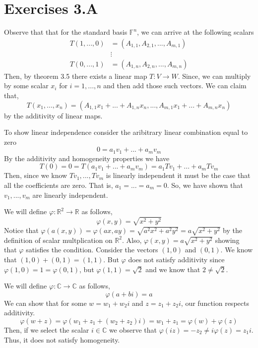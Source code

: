 \documentclass[10pt, twocolumn]{article}
\newcommand{\C}{\mathbb{C}}
\newcommand{\R}{\mathbb{R}}
\newcommand{\F}{\mathbb{F}}
\begin{document}
\section{Exercises 3.A}
\begin{q}[3]
	Observe that that for the standard basis $ \F^n $, 
	we can arrive at the following scalars 
	\begin{align*}
		T(1, ..., 0) &= (A_{1, 1}, A_{2, 1}, ..., A_{m, 1}) \\
		& \vdots \\
		T(0, ..., 1) &= (A_{1, n}, A_{2, n}, ..., A_{m, n})
	\end{align*}
	Then, by theorem 3.5 there exists a linear map $ T: V \to W $. 
	Since, we can multiply by some scalar $ x_i $ for $ i = 1, ..., n $ and then add those such vectors. 
	We can claim that, 
	$$ T(x_1, ..., x_n ) =  (A_{1, 1}x_1 + ... + A_{1, n}x_n, ..., A_{m, 1}x_1 + ...+ A_{m, n} x_n) $$
	by the additivity of linear maps. 
\end{q}
\begin{q}[4]
	To show linear independence consider the aribitrary linear combination equal to zero
	$$ 0 = a_1v_1 + ... + a_m v_m $$
	By the additivity and homogeneity properties we have 
	$$ T(0) = 0 = T(a_1v_1 + ... + a_m v_m) = a_1Tv_1 + ... + a_mTv_m $$
	Then, since we know $ Tv_1, ..., Tv_m $ is linearly independent it must be the case that all the coefficients are zero. 
	That is, $ a_1 = ... = a_m = 0 $. 
	So, we have shown that $ v_1, ..., v_m $ are linearly independent. 
\end{q}
\begin{q}[8]
	We will define $ \varphi: \R^2 \to \R $ as follows, 
	\[ \varphi (x, y) = \sqrt{x^2 + y^2} \]
	Notice that $ \varphi(a(x, y)) = \varphi(ax, ay) = \sqrt{a^2x^2 + a^2y^2} = a \sqrt{x^2 + y^2} $ by the definition of scalar multplication on $ \R^2 $.
	Also, $\varphi(x, y) = a\sqrt{x^2 + y^2}$ showing that $ \varphi $ satisfies the condition.
	Consider the vectors $ (1, 0) $ and $ (0, 1) $. 
	We know that $ (1, 0) + (0, 1) = (1, 1) $. 
	But $ \varphi $ does not satisfy additivity since 
	$ \varphi (1, 0) = 1 = \varphi (0, 1) $, but $ \varphi(1, 1) = \sqrt{2} $ and we know that $ 2 \neq \sqrt{2} $.
\end{q}
\begin{q}[9]
	We will define $ \varphi: \C \to \C $ as follows, 
	$$ \varphi(a + bi) = a $$ 
	We can show that for some $ w = w_1 + w_2i $ and $ z = z_1+ z_2i $, our function respects additivity.
	$$ \varphi(w + z) = \varphi(w_1 + z_1 + (w_2 + z_2)i) = w_1 + z_1 = \varphi(w) + \varphi(z) $$
	Then, if we select the scalar $ i \in \C $ we observe that $ \varphi(iz) = -z_2 \neq i\varphi(z) = z_1i $. 
	Thus, it does not satisfy homogeneity. 
\end{q}
\end{document}
